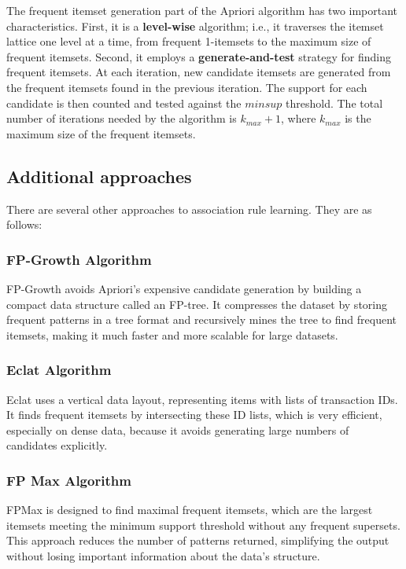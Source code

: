 \documentclass[conference]{IEEEtran}
\begin{document}
The frequent itemset generation part of the Apriori algorithm has two important characteristics. First, it is a \textbf{level-wise} algorithm; i.e., it traverses the itemset lattice one level at a time, from frequent 1-itemsets to the maximum size of frequent itemsets. Second, it employs a \textbf{generate-and-test} strategy for finding frequent itemsets. At each iteration, new candidate itemsets are generated from the frequent itemsets found in the previous iteration. The support for each candidate is then counted and tested against the \( minsup \) threshold. The total number of iterations needed by the algorithm is \( k_{max} + 1 \), where \( k_{max} \) is the maximum size of the frequent itemsets.


\subsection{Additional approaches}
There are several other approaches to association rule learning. They are as follows:

\subsubsection{FP-Growth Algorithm}
FP-Growth avoids Apriori’s expensive candidate generation by building a compact data structure called an FP-tree. It compresses the dataset by storing frequent patterns in a tree format and recursively mines the tree to find frequent itemsets, making it much faster and more scalable for large datasets.

\subsubsection{Eclat Algorithm}
Eclat uses a vertical data layout, representing items with lists of transaction IDs. It finds frequent itemsets by intersecting these ID lists, which is very efficient, especially on dense data, because it avoids generating large numbers of candidates explicitly.

\subsubsection{FP Max Algorithm}
FPMax is designed to find maximal frequent itemsets, which are the largest itemsets meeting the minimum support threshold without any frequent supersets. This approach reduces the number of patterns returned, simplifying the output without losing important information about the data’s structure.
\end{document}
